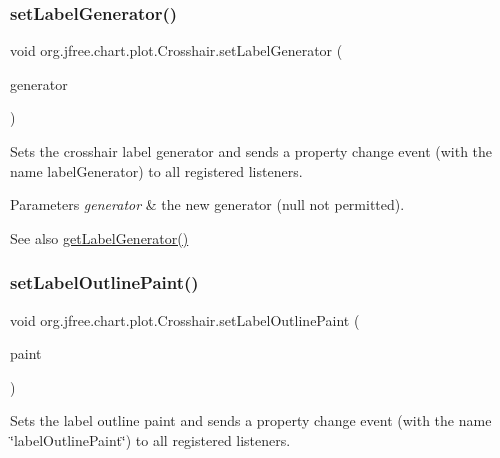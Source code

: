 \subsubsection{\texorpdfstring{set\+Label\+Generator()}{setLabelGenerator()}}
{\footnotesize\ttfamily void org.\+jfree.\+chart.\+plot.\+Crosshair.\+set\+Label\+Generator (\begin{DoxyParamCaption}\item[{\mbox{\hyperlink{interfaceorg_1_1jfree_1_1chart_1_1labels_1_1_crosshair_label_generator}{Crosshair\+Label\+Generator}}}]{generator }\end{DoxyParamCaption})}

Sets the crosshair label generator and sends a property change event (with the name \textquotesingle{}label\+Generator\textquotesingle{}) to all registered listeners.


\begin{DoxyParams}{Parameters}
{\em generator} & the new generator ({\ttfamily null} not permitted).\\
\hline
\end{DoxyParams}
\begin{DoxySeeAlso}{See also}
\mbox{\hyperlink{classorg_1_1jfree_1_1chart_1_1plot_1_1_crosshair_ad20e769eeae9e0ba7f04c152b080a04f}{get\+Label\+Generator()}} 
\end{DoxySeeAlso}
\mbox{\label{classorg_1_1jfree_1_1chart_1_1plot_1_1_crosshair_a66fecb4b6c255165fd0f116b3890f415}} 
\subsubsection{\texorpdfstring{set\+Label\+Outline\+Paint()}{setLabelOutlinePaint()}}
{\footnotesize\ttfamily void org.\+jfree.\+chart.\+plot.\+Crosshair.\+set\+Label\+Outline\+Paint (\begin{DoxyParamCaption}\item[{Paint}]{paint }\end{DoxyParamCaption})}

Sets the label outline paint and sends a property change event (with the name \char`\"{}label\+Outline\+Paint\char`\"{}) to all registered listeners.


